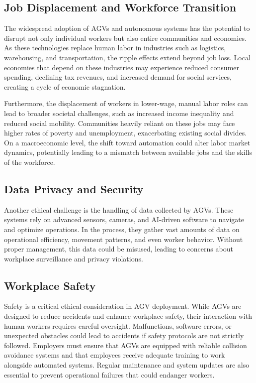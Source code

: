 \documentclass[../../main]{subfiles}
\begin{document}
\subsection{Job Displacement and Workforce Transition}

The widespread adoption of AGVs and autonomous systems has the potential 
to disrupt not only individual workers but also entire communities and economies. 
As these technologies replace human labor in industries such as logistics, warehousing, 
and transportation, the ripple effects extend beyond job loss. Local economies that depend 
on these industries may experience reduced consumer spending, declining tax revenues, and 
increased demand for social services, creating a cycle of economic stagnation.

Furthermore, the displacement of workers in lower-wage, manual labor roles can lead to 
broader societal challenges, such as increased income inequality and reduced social mobility. 
Communities heavily reliant on these jobs may face higher rates of poverty and unemployment, 
exacerbating existing social divides. On a macroeconomic level, the shift toward automation 
could alter labor market dynamics, potentially leading to a mismatch between available jobs 
and the skills of the workforce.

\subsection{Data Privacy and Security}

Another ethical challenge is the handling of data collected by AGVs. 
These systems rely on advanced sensors, cameras, 
and AI-driven software to navigate and optimize operations. 
In the process, they gather vast amounts of data 
on operational efficiency, movement patterns, 
and even worker behavior. 
Without proper management, this data could be misused, 
leading to concerns about workplace surveillance 
and privacy violations. 

\subsection{Workplace Safety}

Safety is a critical ethical consideration in AGV deployment. 
While AGVs are designed to reduce accidents 
and enhance workplace safety, 
their interaction with human workers requires careful oversight. 
Malfunctions, software errors, or unexpected obstacles 
could lead to accidents if safety protocols are not strictly followed. 
Employers must ensure that AGVs are equipped 
with reliable collision avoidance systems 
and that employees receive adequate training 
to work alongside automated systems. 
Regular maintenance and system updates are also essential 
to prevent operational failures that could endanger workers.
\end{document}
